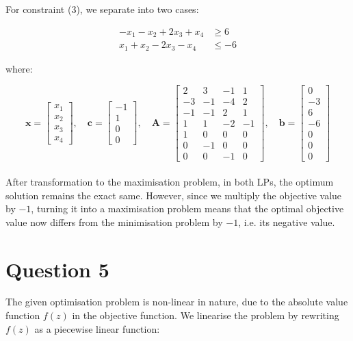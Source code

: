 \documentclass[12pt]{article}
\begin{document}
\noindent For constraint (3), we separate into two cases: 

\begin{align*}
    - x_{1} - x_{2} + 2 x_{3} + x_{4} & \geq 6 \\
    x_{1} + x_{2} -2 x_{3} -x_{4} & \leq -6
\end{align*}

\noindent where:

\begin{equation*}
    \mathbf{x} = \begin{bmatrix}
        x_{1} \\ x_{2} \\ x_{3} \\ x_{4} 
    \end{bmatrix},
    \quad 
    \mathbf{c} = \begin{bmatrix}
        -1 \\ 1 \\ 0 \\ 0
    \end{bmatrix},
    \quad 
    \mathbf{A} = \begin{bmatrix}
        2 & 3 & -1 & 1 \\ 
        -3 & -1 & -4 & 2 \\ 
        -1 & -1 & 2 & 1 \\ 
        1 & 1 & -2 & -1 \\ 
        1 & 0 & 0 & 0 \\ 
        0 & -1 & 0 & 0 \\ 
        0 & 0 & -1 & 0 
    \end{bmatrix},
    \quad 
    \mathbf{b} = \begin{bmatrix}
        0 \\ -3 \\ 6 \\ -6 \\ 0 \\ 0 \\ 0
    \end{bmatrix}
\end{equation*} \\

\noindent After transformation to the maximisation problem, in both LPs, the optimum solution remains the exact same. However, since we multiply the objective value by $-1$, turning it into a maximisation problem means that the optimal objective value now differs from the minimisation problem by $-1$, i.e. its negative value. 

\newpage 
\section*{Question 5}
The given optimisation problem is non-linear in nature, due to the absolute value function $f(z)$ in the objective function. We linearise the problem by rewriting $f(z)$ as a piecewise linear function:
\end{document}
